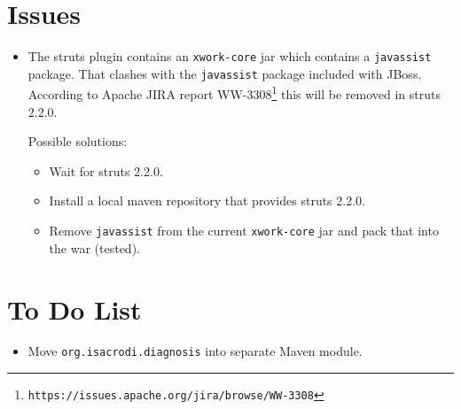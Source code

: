 \documentclass[a4paper,fleqn]{article}
\newcommand{\computercode}[1]{\texttt{#1}}
\begin{document}
\section{Issues}

\begin{itemize}

\item The struts plugin contains an \computercode{xwork-core} jar
  which contains a \computercode{javassist} package. That clashes with
  the \computercode{javassist} package included with JBoss. According
  to Apache JIRA report
  WW-3308\footnote{\computercode{https://issues.apache.org/jira/browse/WW-3308}}
  this will be removed in struts 2.2.0.

  Possible solutions:
  \begin{itemize}
  \item Wait for struts 2.2.0.
  \item Install a local maven repository that provides struts 2.2.0.
  \item Remove \computercode{javassist} from the current
    \computercode{xwork-core} jar and pack that into the war (tested).
  \end{itemize}

\end{itemize}


\section{To Do List}

\begin{itemize}

\item Move \computercode{org.isacrodi.diagnosis} into separate Maven
  module.

\end{itemize}
\end{document}
